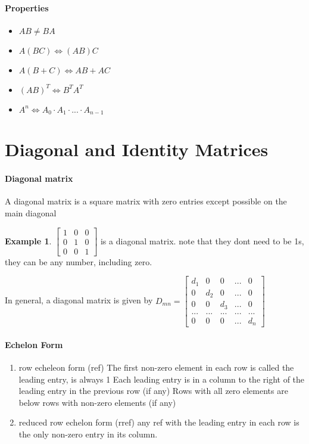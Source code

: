 \documentclass{article}
\theoremstyle{definition}
\newtheorem{example}[theorem]{Example}
\theoremstyle{remark}
\begin{document}
\paragraph{Properties}
\begin{itemize}
    \item $AB \neq BA$
    \item $A(BC) \Leftrightarrow (AB)C$
    \item $A(B + C) \Leftrightarrow AB + AC$ 
    \item $(AB)^T \Leftrightarrow B^TA^T$
    \item $A^n \Leftrightarrow A_0 \cdot A_1 \cdot ... \cdot A_{n-1}$
\end{itemize}

\section{Diagonal and Identity Matrices}

\paragraph{Diagonal matrix}
A diagonal matrix is a square matrix with zero entries except possible on the main diagonal

\begin{example}
    $\begin{bmatrix}
        1 & 0 & 0 \\
        0 & 1 & 0 \\
        0 & 0 & 1
    \end{bmatrix}$ is a diagonal matrix. note that they dont need to be 1s, they can be any number, including zero. 
\end{example}

In general, a diagonal matrix is given by $D_{mn} = \begin{bmatrix}
    d_1 & 0 & 0 & ... & 0 \\
    0 & d_2 & 0 & ... & 0 \\
    0 & 0 & d_3 & ... & 0 \\
    ... & ... & ... & ... & ... \\
    0 & 0 & 0 & ... & d_n
\end{bmatrix}$

\paragraph{Echelon Form}

\begin{enumerate}
    \item row echeleon form (ref)
    \subitem The first non-zero element in each row is called the leading entry, is always 1
    \subitem Each leading entry is in a column to the right of the leading entry in the previous row (if any)
    \subitem Rows with all zero elements are below rows with non-zero elements (if any)
    \item reduced row echelon form (rref)
    \subitem any ref with the leading entry in each row is the only non-zero entry in its column. 
\end{enumerate}
\end{document}
